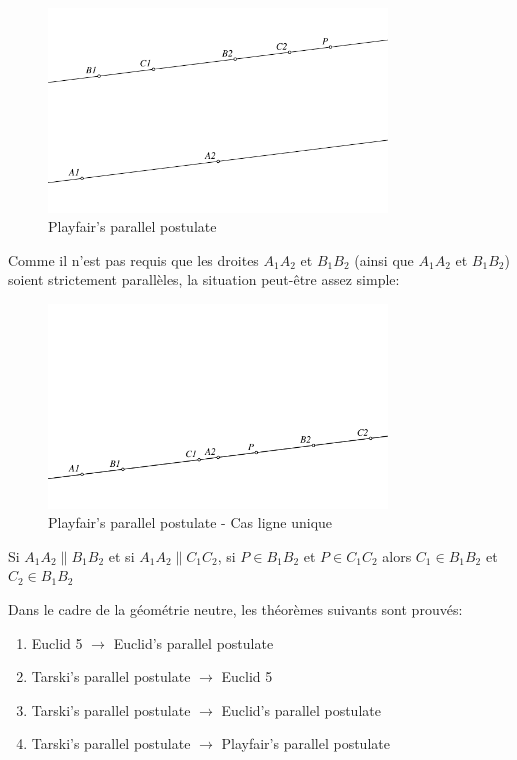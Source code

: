 \documentclass[8pt,a4paper]{article}
\theoremstyle{plain}
\begin{document}
  \begin{figure}[H] %
  \centering
    \includegraphics[width=90mm]{fig03a.pdf}
    \caption{Playfair's parallel postulate\label{Playfair1}}
  \end{figure}
      Comme il n'est pas requis que les droites $A_1A_2$ et $B_1B_2$ (ainsi que $A_1A_2$ et $B_1B_2$) soient strictement parallèles, la situation peut-être assez simple:
  \begin{figure}[H] %
  \centering
    \includegraphics[width=90mm]{fig03b.pdf}
\caption{Playfair's parallel postulate - Cas ligne unique\label{Playfair2}}
\end{figure}

  
    Si $A_1A_2\parallel B_1B_2$ et si $A_1A_2\parallel C_1C_2$,
      si $P \in B_1B_2$ et $P \in C_1C_2$ alors 
      $C_1 \in B_1B_2$ et $C_2\in B_1B_2$

  
  Dans le cadre de la géométrie neutre, les théorèmes suivants sont prouvés:
  \begin{enumerate}
   \item Euclid 5 $\longrightarrow$ Euclid's parallel postulate
   \item Tarski's parallel postulate $\longrightarrow$ Euclid 5
   \item Tarski's parallel postulate $\longrightarrow$ Euclid's parallel postulate
   \item Tarski's parallel postulate $\longrightarrow$ Playfair's parallel postulate
  \end{enumerate}
\end{document}

